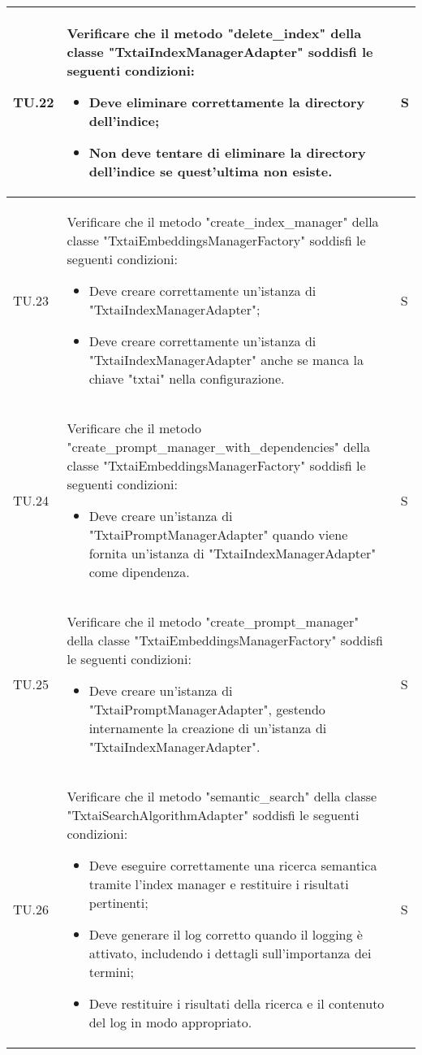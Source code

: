 \begin{adjustwidth}{-0.5cm}{-0.5cm}
\begin{longtable}{|P{1.5cm}|>{\raggedright}P{9.5cm}|>{\arraybackslash}P{1.5cm}|}
		\hline TU.22 & Verificare che il metodo "delete\_index" della classe "TxtaiIndexManagerAdapter" soddisfi le seguenti condizioni:
		\begin{itemize}
			\item Deve eliminare correttamente la directory dell'indice;
			\item Non deve tentare di eliminare la directory dell'indice se quest'ultima non esiste.
		\end{itemize} & S \\

		\hline TU.23 & Verificare che il metodo "create\_index\_manager" della classe "TxtaiEmbeddingsManagerFactory" soddisfi le seguenti condizioni:
		\begin{itemize}
			\item Deve creare correttamente un'istanza di "TxtaiIndexManagerAdapter";
			\item Deve creare correttamente un'istanza di "TxtaiIndexManagerAdapter" anche se manca la chiave "txtai" nella configurazione.
		\end{itemize} & S \\

		\hline TU.24 & Verificare che il metodo "create\_prompt\_manager\_with\_dependencies" della classe "TxtaiEmbeddingsManagerFactory" soddisfi le seguenti condizioni:
		\begin{itemize}
			\item Deve creare un'istanza di "TxtaiPromptManagerAdapter" quando viene fornita un'istanza di "TxtaiIndexManagerAdapter" come dipendenza.
		\end{itemize} & S \\

		\hline TU.25 & Verificare che il metodo "create\_prompt\_manager" della classe "TxtaiEmbeddingsManagerFactory" soddisfi le seguenti condizioni:
		\begin{itemize}
			\item Deve creare un'istanza di "TxtaiPromptManagerAdapter", gestendo internamente la creazione di un'istanza di "TxtaiIndexManagerAdapter".
		\end{itemize} & S \\

		\hline TU.26 & Verificare che il metodo "semantic\_search" della classe "TxtaiSearchAlgorithmAdapter" soddisfi le seguenti condizioni:
		\begin{itemize}
			\item Deve eseguire correttamente una ricerca semantica tramite l'index manager e restituire i risultati pertinenti;
			\item Deve generare il log corretto quando il logging è attivato, includendo i dettagli sull'importanza dei termini;
			\item Deve restituire i risultati della ricerca e il contenuto del log in modo appropriato.
		\end{itemize} & S \\


\end{longtable}
\end{adjustwidth}
